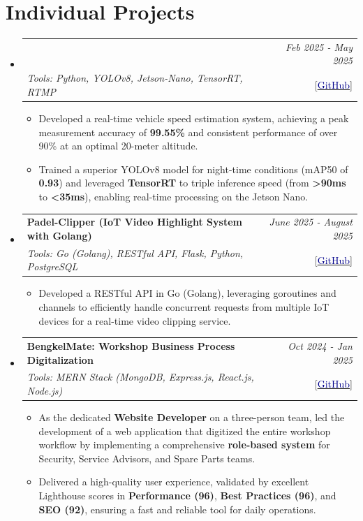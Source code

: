 \documentclass[a4paper,11pt]{article}
\makeatletter
\newcommand{\resumeItemMain}[1]{
  \item #1
}
\newcommand{\resumeProject}[4]{
\vspace{0.5mm}\item
    \begin{tabular*}{0.98\textwidth}[t]{l@{\extracolsep{\fill}}r}
        \textbf{#1} & \textit{\footnotesize{#3}} \\
        \footnotesize{\textit{#2}} & \footnotesize{#4}
    \end{tabular*}
    \vspace{-2.4mm}
}
\newcommand{\resumeSubHeadingListStart}{\begin{itemize}[leftmargin=*,labelsep=0.1mm]}
\newcommand{\resumeItemListStart}{\begin{itemize}[leftmargin=*,labelsep=1mm,itemsep=0.5mm]}
\newcommand{\resumeSubHeadingListEnd}{\end{itemize}\vspace{2mm}}
\newcommand{\resumeItemListEnd}{\end{itemize}\vspace{-2mm}}
\makeatother
\begin{document}
\section{\textbf{Individual Projects}}
\vspace{-0.4mm}
\resumeSubHeadingListStart

\resumeProject
    {\parbox{0.8\linewidth}{Vehicle Speed Estimation System Using Drone with Jetson Nano-based YOLOv8 Method}}
    {Tools: Python, YOLOv8, Jetson-Nano, TensorRT, RTMP}
    {Feb 2025 - May 2025}
    {{}[\href{https://github.com/still-breath/speed-detection_drone_jetson-nano}
    {\textcolor{darkblue}{GitHub}}]}
\resumeItemListStart
    \resumeItemMain{Developed a real-time vehicle speed estimation system, achieving a peak measurement accuracy of \textbf{99.55\%} and consistent performance of over 90\% at an optimal 20-meter altitude.}
    \resumeItemMain{Trained a superior YOLOv8 model for night-time conditions (mAP50 of \textbf{0.93}) and leveraged \textbf{TensorRT} to triple inference speed (from \textbf{>90ms} to \textbf{<35ms}), enabling real-time processing on the Jetson Nano.}
\resumeItemListEnd

\resumeProject
    {Padel-Clipper (IoT Video Highlight System with Golang)}
    {Tools: Go (Golang), RESTful API, Flask, Python, PostgreSQL}
    {June 2025 - August 2025}
    {{}[\href{https://github.com/still-breath/clipper-dashboard-go}
    {\textcolor{darkblue}{GitHub}}]}
\resumeItemListStart
    \resumeItemMain{Developed a RESTful API in Go (Golang), leveraging goroutines and channels to efficiently handle concurrent requests from multiple IoT devices for a real-time video clipping service.}
\resumeItemListEnd

\resumeProject
    {BengkelMate: Workshop Business Process Digitalization}
    {Tools: MERN Stack (MongoDB, Express.js, React.js, Node.js)}
    {Oct 2024 - Jan 2025}
    {{}[\href{https://github.com/still-breath/webapp-astrawaru}
    {\textcolor{darkblue}{GitHub}}]}
\resumeItemListStart
    \resumeItemMain{As the dedicated \textbf{Website Developer} on a three-person team, led the development of a web application that digitized the entire workshop workflow by implementing a comprehensive \textbf{role-based system} for Security, Service Advisors, and Spare Parts teams.}
    \resumeItemMain{Delivered a high-quality user experience, validated by excellent Lighthouse scores in \textbf{Performance (96)}, \textbf{Best Practices (96)}, and \textbf{SEO (92)}, ensuring a fast and reliable tool for daily operations.}
\resumeItemListEnd
\resumeSubHeadingListEnd
\vspace{-8mm}
\end{document}

